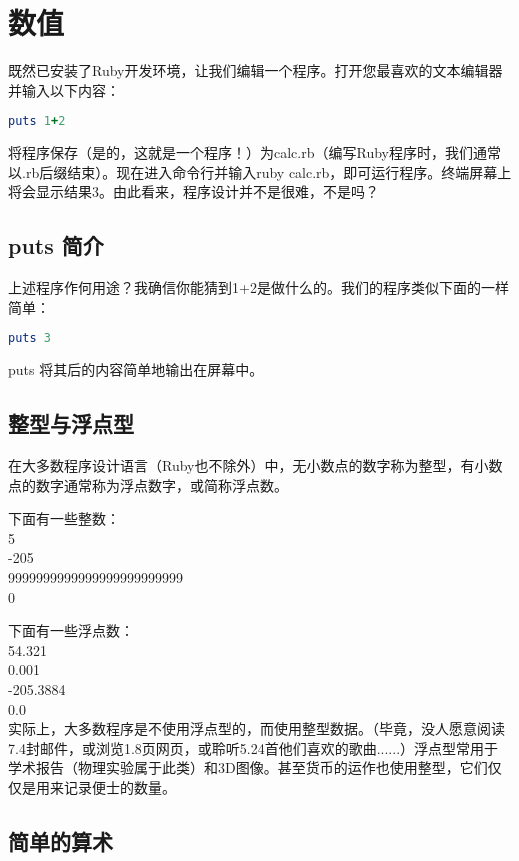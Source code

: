 \chapter{数值}

既然已安装了Ruby开发环境，让我们编辑一个程序。打开您最喜欢的文本编辑器并输入以下内容：
\begin{lstlisting}[language=ruby]
puts 1+2
\end{lstlisting}

将程序保存（是的，这就是一个程序！）为calc.rb（编写Ruby程序时，我们通常以.rb后缀结束）。现在进入命令行并输入ruby calc.rb，即可运行程序。终端屏幕上将会显示结果3。由此看来，程序设计并不是很难，不是吗？

\section{puts 简介}

上述程序作何用途？我确信你能猜到1+2是做什么的。我们的程序类似下面的一样简单：
\begin{lstlisting}[language=ruby]
puts 3
\end{lstlisting}

puts 将其后的内容简单地输出在屏幕中。

\section{整型与浮点型}

在大多数程序设计语言（Ruby也不除外）中，无小数点的数字称为整型，有小数点的数字通常称为浮点数字，或简称浮点数。

下面有一些整数：\\
5\\
-205\\
9999999999999999999999999\\
0

下面有一些浮点数：\\
54.321\\
0.001\\
-205.3884\\
0.0\\

实际上，大多数程序是不使用浮点型的，而使用整型数据。（毕竟，没人愿意阅读7.4封邮件，或浏览1.8页网页，或聆听5.24首他们喜欢的歌曲......）浮点型常用于学术报告（物理实验属于此类）和3D图像。甚至货币的运作也使用整型，它们仅仅是用来记录便士的数量。

\section{简单的算术}

